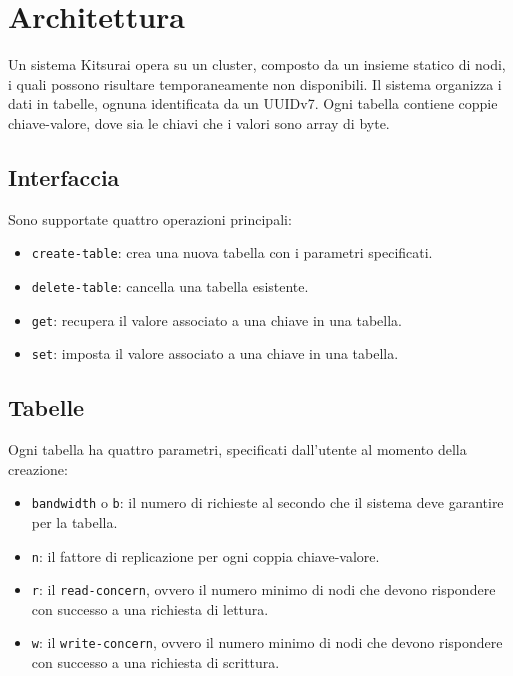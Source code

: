 \section{Architettura}
\label{sec:architettura}

Un sistema Kitsurai opera su un cluster, composto da un insieme statico di nodi, i quali possono risultare temporaneamente non disponibili.
Il sistema organizza i dati in tabelle, ognuna identificata da un UUIDv7. Ogni tabella contiene coppie chiave-valore, dove sia le chiavi che i valori sono array di byte.

\subsection{Interfaccia}
\label{subsec:interfaccia}

Sono supportate quattro operazioni principali:
\begin{itemize}
    \item \texttt{create-table}: crea una nuova tabella con i parametri specificati.
    \item \texttt{delete-table}: cancella una tabella esistente.
    \item \texttt{get}: recupera il valore associato a una chiave in una tabella.
    \item \texttt{set}: imposta il valore associato a una chiave in una tabella.
\end{itemize}

\subsection{Tabelle}
\label{subsec:tabelle}

Ogni tabella ha quattro parametri, specificati dall'utente al momento della creazione:
\begin{itemize}
    \item \texttt{bandwidth} o \texttt{b}: il numero di richieste al secondo che il sistema deve garantire per la tabella.
    \item \texttt{n}: il fattore di replicazione per ogni coppia chiave-valore.
    \item \texttt{r}: il \texttt{read-concern}, ovvero il numero minimo di nodi che devono rispondere con successo a una richiesta di lettura.
    \item \texttt{w}: il \texttt{write-concern}, ovvero il numero minimo di nodi che devono rispondere con successo a una richiesta di scrittura.
\end{itemize}

